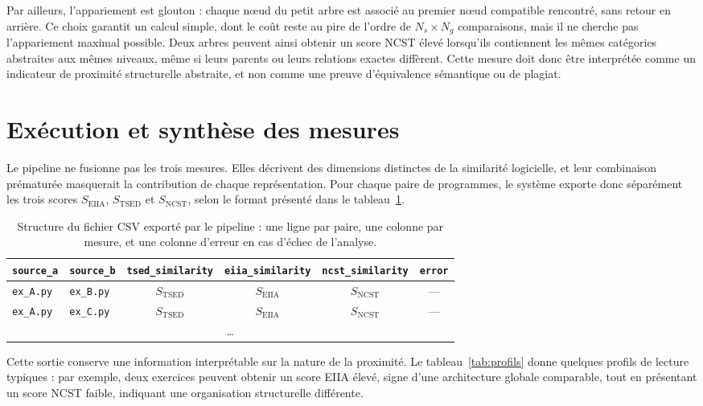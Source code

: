 \documentclass[12pt,a4paper,oneside]{report}
\begin{document}
Par ailleurs, l'appariement est glouton : chaque nœud du petit arbre est
associé au premier nœud compatible rencontré, sans retour en arrière. Ce choix
garantit un calcul simple, dont le coût reste au pire de l'ordre de
$N_s \times N_g$ comparaisons, mais il ne cherche pas l'appariement maximal
possible. Deux
arbres peuvent ainsi obtenir un score NCST élevé lorsqu'ils contiennent les
mêmes catégories abstraites aux mêmes niveaux, même si leurs parents ou leurs
relations exactes diffèrent. Cette mesure doit donc être interprétée comme un
indicateur de proximité structurelle abstraite, et non comme une preuve
d'équivalence sémantique ou de plagiat.

\section{Exécution et synthèse des mesures}

Le pipeline ne fusionne pas les trois mesures. Elles décrivent des dimensions
distinctes de la similarité logicielle, et leur combinaison prématurée
masquerait la contribution de chaque représentation. Pour chaque paire de
programmes, le système exporte donc séparément les trois scores
$S_{\mathrm{EIIA}}$, $S_{\mathrm{TSED}}$ et $S_{\mathrm{NCST}}$, selon le
format présenté dans le tableau~\ref{tab:csv}.

\begin{table}[htbp]
\centering
\small
\begin{tabular}{llcccc}
\toprule
\texttt{source\_a} & \texttt{source\_b} & \texttt{tsed\_similarity} &
\texttt{eiia\_similarity} & \texttt{ncst\_similarity} & \texttt{error} \\
\midrule
\texttt{ex\_A.py} & \texttt{ex\_B.py} & $S_{\mathrm{TSED}}$ & $S_{\mathrm{EIIA}}$ & $S_{\mathrm{NCST}}$ & --- \\
\texttt{ex\_A.py} & \texttt{ex\_C.py} & $S_{\mathrm{TSED}}$ & $S_{\mathrm{EIIA}}$ & $S_{\mathrm{NCST}}$ & --- \\
\multicolumn{6}{c}{\dots} \\
\bottomrule
\end{tabular}
\caption{Structure du fichier CSV exporté par le pipeline : une ligne par
paire, une colonne par mesure, et une colonne d'erreur en cas d'échec de
l'analyse.}
\label{tab:csv}
\end{table}

Cette sortie conserve une information interprétable sur la nature de la
proximité. Le tableau~\ref{tab:profils} donne quelques profils de lecture
typiques : par exemple, deux exercices peuvent obtenir un score EIIA élevé,
signe d'une architecture globale comparable, tout en présentant un score NCST
faible, indiquant une organisation structurelle différente.
\end{document}
